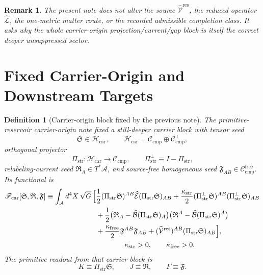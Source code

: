 \documentclass[11pt]{article}
\newcommand{\Sub}{\mathcal A}
\newcommand{\ResidualLift}{\widehat{\mathcal V}^{\mathrm{res}}}
\newcommand{\SubEinLin}{\widehat{\mathcal E}}
\newcommand{\SubGaugeVec}{\widehat{\mathcal B}}
\newcommand{\SubReducedEin}{\widehat{\mathcal L}}
\newcommand{\CompClass}{\mathscr C_{\mathrm{cmp}}}
\newcommand{\CompFree}{\mathscr C_{\mathrm{cmp}}^{\mathrm{free}}}
\newcommand{\CarrierFunctional}{\mathscr F_{\mathrm{car}}}
\newcommand{\FreeStiff}{\kappa_{\mathrm{free}}}
\newcommand{\PrimStrain}{K}
\newcommand{\PrimNeutral}{J}
\newcommand{\PrimFree}{F}
\newcommand{\CarrierClass}{\mathscr H_{\mathrm{car}}}
\newcommand{\CarrierProj}{\Pi_{\mathrm{str}}}
\newcommand{\CarrierPerp}{\Pi_{\mathrm{str}}^{\perp}}
\newcommand{\CarrierGap}{\kappa_{\mathrm{str}}}
\newcommand{\CarrierSeed}{\mathfrak S}
\newcommand{\RelabelSeed}{\mathfrak R}
\newcommand{\FreeSeed}{\mathfrak F}
\newtheorem{definition}{Definition}
\newtheorem{remark}{Remark}
\begin{document}
\begin{remark}
The present note does not alter the source \(\ResidualLift\), the reduced operator \(\SubReducedEin\), the one-metric matter route, or the recorded admissible completion class. It asks why the whole carrier-origin projection/current/gap block is itself the correct deeper unsuppressed sector.
\end{remark}

\section{Fixed Carrier-Origin and Downstream Targets}

\begin{definition}[Carrier-origin block fixed by the previous note]
\label{def:carrier}
The primitive-reservoir carrier-origin note fixed a still-deeper carrier block with tensor seed
\[
\CarrierSeed\in\CarrierClass,
\qquad
\CarrierClass=\CompClass\oplus\CompClass^\perp,
\]
orthogonal projector
\[
\CarrierProj:\CarrierClass\to\CompClass,
\qquad
\CarrierPerp\equiv I-\CarrierProj,
\]
relabeling-current seed \(\RelabelSeed_A\in T^*\Sub\), and source-free homogeneous seed \(\FreeSeed_{AB}\in\CompFree\). Its functional is
\begin{equation}
\begin{aligned}
\CarrierFunctional[\CarrierSeed,\RelabelSeed,\FreeSeed]
\equiv
\int_{\Sub} d^4X\,\sqrt{G}\,
\Bigl[
&\frac12 (\CarrierProj\CarrierSeed)^{AB}
\SubEinLin(\CarrierProj\CarrierSeed)_{AB}
+\frac{\CarrierGap}{2}(\CarrierPerp\CarrierSeed)^{AB}(\CarrierPerp\CarrierSeed)_{AB}
\\
&+\frac12\bigl(\RelabelSeed_A-\SubGaugeVec(\CarrierProj\CarrierSeed)_A\bigr)
\bigl(\RelabelSeed^A-\SubGaugeVec(\CarrierProj\CarrierSeed)^A\bigr)
\\
&+\frac{\FreeStiff}{2}\FreeSeed^{AB}\FreeSeed_{AB}
+(\ResidualLift)^{AB}(\CarrierProj\CarrierSeed)_{AB}
\Bigr],
\\
&\qquad\qquad \CarrierGap>0,\qquad \FreeStiff>0.
\end{aligned}
\label{eq:car}
\end{equation}
The primitive readout from that carrier block is
\begin{equation}
\PrimStrain\equiv \CarrierProj\CarrierSeed,
\qquad
\PrimNeutral\equiv \RelabelSeed,
\qquad
\PrimFree\equiv \FreeSeed.
\label{eq:readout}
\end{equation}
\end{definition}
\end{document}
